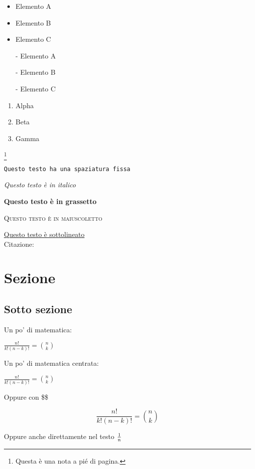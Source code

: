 \documentclass[twoside]{supsistudent}
\begin{document}
\begin{itemize}
  \item Elemento A
  \item Elemento B
  \item Elemento C
\end{itemize}

\begin{itemize}
  \item[-] Elemento A
  \item[-] Elemento B
  \item[-] Elemento C
\end{itemize}

\begin{enumerate}
 \item Alpha
  \item Beta
  \item Gamma
\end{enumerate}

\footnote{Questa è una nota a pi\'e di pagina.}

\texttt{Questo testo ha una spaziatura fissa}

\textit{Questo testo \`e in italico}

\textbf{Questo testo \`e in grassetto}

\textsc{Questo testo \`e in maiuscoletto}

\underline{Questo testo \`e sottolineato} \\

Citazione:
\begin{quote}
\lipsum[23]
\end{quote}

\section{Sezione}

\lipsum[23]

\subsection{Sotto sezione}

Un po' di matematica: \newline

\begin{math}
\frac{n!}{k!(n-k)!} = {n \choose k}
\end{math} \newline

Un po' di matematica centrata:

\begin{center}
\begin{math}
\frac{n!}{k!(n-k)!} = {n \choose k}
\end{math}
\end{center}

Oppure con \$\$

$$
\frac{n!}{k!(n-k)!} = {n \choose k}
$$

Oppure anche direttamente nel testo ${1}\over{n}$ \\

\lipsum[23]



\end{document}

